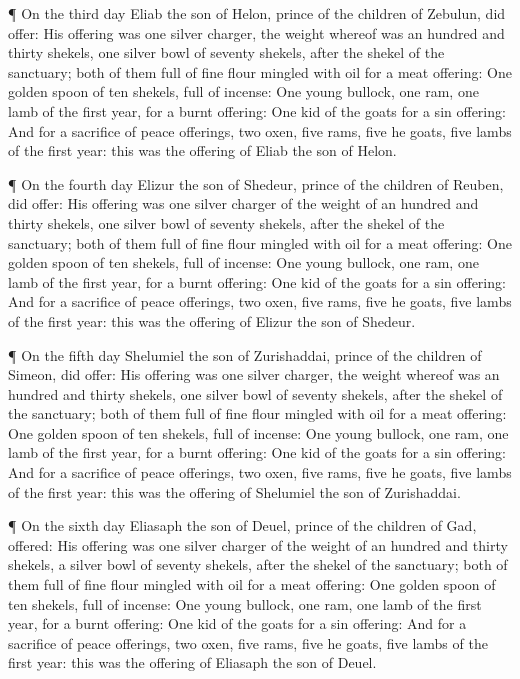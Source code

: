  ¶ On the third day Eliab the son of Helon, prince of the
children of Zebulun, did offer:  His offering was one
silver charger, the weight whereof was an hundred and thirty shekels,
one silver bowl of seventy shekels, after the shekel of the sanctuary;
both of them full of fine flour mingled with oil for a meat offering:
 One golden spoon of ten shekels, full of incense:
 One young bullock, one ram, one lamb of the first year,
for a burnt offering:  One kid of the goats for a sin
offering:  And for a sacrifice of peace offerings, two
oxen, five rams, five he goats, five lambs of the first year: this was
the offering of Eliab the son of Helon.

 ¶ On the fourth day Elizur the son of Shedeur, prince of
the children of Reuben, did offer:  His offering was one
silver charger of the weight of an hundred and thirty shekels, one
silver bowl of seventy shekels, after the shekel of the sanctuary; both
of them full of fine flour mingled with oil for a meat offering:
 One golden spoon of ten shekels, full of incense:
 One young bullock, one ram, one lamb of the first year,
for a burnt offering:  One kid of the goats for a sin
offering:  And for a sacrifice of peace offerings, two
oxen, five rams, five he goats, five lambs of the first year: this was
the offering of Elizur the son of Shedeur.

 ¶ On the fifth day Shelumiel the son of Zurishaddai,
prince of the children of Simeon, did offer:  His offering
was one silver charger, the weight whereof was an hundred and thirty
shekels, one silver bowl of seventy shekels, after the shekel of the
sanctuary; both of them full of fine flour mingled with oil for a meat
offering:  One golden spoon of ten shekels, full of
incense:  One young bullock, one ram, one lamb of the first
year, for a burnt offering:  One kid of the goats for a sin
offering:  And for a sacrifice of peace offerings, two
oxen, five rams, five he goats, five lambs of the first year: this was
the offering of Shelumiel the son of Zurishaddai.

 ¶ On the sixth day Eliasaph the son of Deuel, prince of
the children of Gad, offered:  His offering was one silver
charger of the weight of an hundred and thirty shekels, a silver bowl of
seventy shekels, after the shekel of the sanctuary; both of them full of
fine flour mingled with oil for a meat offering:  One
golden spoon of ten shekels, full of incense:  One young
bullock, one ram, one lamb of the first year, for a burnt offering:
 One kid of the goats for a sin offering:  And
for a sacrifice of peace offerings, two oxen, five rams, five he goats,
five lambs of the first year: this was the offering of Eliasaph the son
of Deuel.


